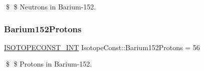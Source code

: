 \$ \$ Neutrons in Barium-\/152. \mbox{\label{group___isotope_const-_barium-_ba152_ga06eb64f511366f4ce995daf4fd34a845}} 
\subsubsection{\texorpdfstring{Barium152\+Protons}{Barium152Protons}}
{\footnotesize\ttfamily \mbox{\hyperlink{group___isotope_const-_macros_ga5f18360b3e99483a35c32d789e62621c}{I\+S\+O\+T\+O\+P\+E\+C\+O\+N\+S\+T\+\_\+\+I\+NT}} Isotope\+Const\+::\+Barium152\+Protons = 56}

\$ \$ Protons in Barium-\/152. 